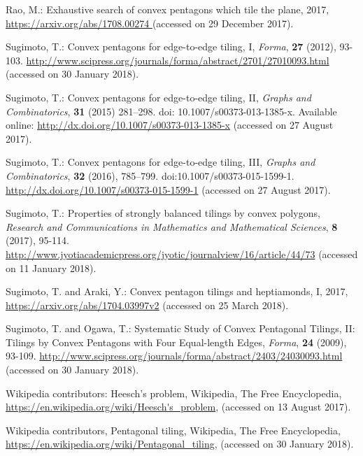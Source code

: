 \documentclass[11pt, a4paper]{article}
\begin{document}
\begin{thebibliography}{99}
{
Rao, M.: Exhaustive search of convex pentagons which tile the plane, 
2017, \url{https://arxiv.org/abs/1708.00274 } (accessed on 29 December 
2017).

Sugimoto, T.: Convex pentagons for edge-to-edge tiling, I,  
\textit{Forma}, \textbf{27} (2012), 93-103. 
\url{http://www.scipress.org/journals/forma/abstract/2701/27010093.html} 
(accessed on 30 January 2018).

Sugimoto, T.: Convex pentagons for edge-to-edge tiling, I\hspace{-.1em}I, 
\textit{Graphs and Combinatorics}, \textbf{31} (2015) 281--298. 
doi: 10.1007/s00373-013-1385-x.
Available online: \url{http://dx.doi.org/10.1007/s00373-013-1385-x}
(accessed on 27 August 2017).

Sugimoto, T.: Convex pentagons for edge-to-edge tiling, I\hspace{-.1em}I\hspace{-.1em}I, 
\textit{Graphs and Combinatorics}, \textbf{32} (2016), 785--799. 
doi:10.1007/s00373-015-1599-1. 
\url{http://dx.doi.org/10.1007/s00373-015-1599-1} (accessed on 27 August 2017).

Sugimoto, T.: Properties of strongly balanced tilings by convex 
polygons, \textit{Research and Communications in Mathematics and 
Mathematical Sciences}, \textbf{8} (2017), 95-114. 
\url{http://www.jyotiacademicpress.org/jyotic/journalview/16/article/44/73} 
(accessed on 11 January 2018).

Sugimoto, T. and Araki, Y.: Convex pentagon tilings and heptiamonds, I, 
2017, \url{https://arxiv.org/abs/1704.03997v2} (accessed on 25 March
2018).

Sugimoto, T. and Ogawa, T.: Systematic Study of Convex Pentagonal Tilings, 
I\hspace{-.1em}I: Tilings by Convex Pentagons with Four Equal-length Edges,
\textit{Forma}, \textbf{24} (2009), 93-109. 
\url{http://www.scipress.org/journals/forma/abstract/2403/24030093.html} 
(accessed on 30 January 2018).

Wikipedia contributors: Heesch's problem, Wikipedia, The Free 
Encyclopedia,
\url{https://en.wikipedia.org/wiki/Heesch's_problem}, 
(accessed on 13 August 2017).

Wikipedia contributors, Pentagonal tiling, Wikipedia, The Free 
Encyclopedia,
\url{https://en.wikipedia.org/wiki/Pentagonal_tiling}, (accessed 
on 30 January 2018).


}
\end{thebibliography}
\end{document}
